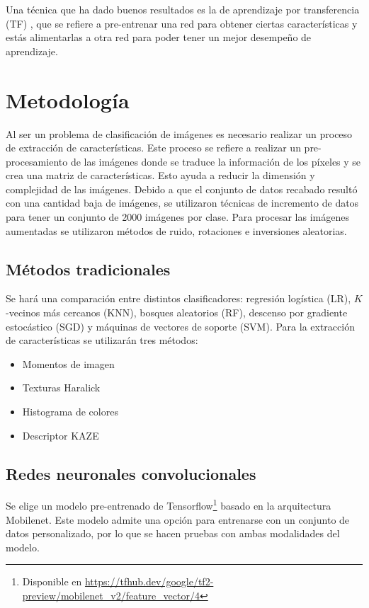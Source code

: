 \documentclass[transmag]{IEEEtran}
\begin{document}
Una técnica que ha dado buenos resultados es la de aprendizaje por transferencia (TF) \cite{yosinski2014transferable}, que se refiere a pre-entrenar una red para obtener ciertas características y estás alimentarlas a otra red para poder tener un mejor desempeño de aprendizaje. 
\section{Metodología}

Al ser un problema de clasificación de imágenes es necesario realizar un proceso de extracción de características. Este proceso se refiere a realizar un pre-procesamiento de las imágenes donde se traduce la información de los píxeles y se crea una matriz de características. Esto ayuda a reducir la dimensión y complejidad de las imágenes. Debido a que el conjunto de datos recabado resultó con una cantidad baja de imágenes, se utilizaron técnicas de incremento de datos para tener un conjunto de 2000 imágenes por clase. Para procesar las imágenes aumentadas se utilizaron métodos de ruido, rotaciones e inversiones aleatorias.

\subsection{Métodos tradicionales}

Se hará una comparación entre distintos clasificadores: regresión logística (LR), $ K $-vecinos más cercanos (KNN), bosques aleatorios (RF), descenso por gradiente estocástico (SGD) y máquinas de vectores de soporte (SVM). Para la extracción de características se utilizarán tres métodos:

\begin{itemize}
	\item Momentos de imagen
	\item Texturas Haralick
	\item Histograma de colores
	\item Descriptor KAZE
\end{itemize}

\subsection{Redes neuronales convolucionales}

Se elige un modelo pre-entrenado de Tensorflow\footnote{Disponible en \url{https://tfhub.dev/google/tf2-preview/mobilenet_v2/feature_vector/4}} basado en la arquitectura Mobilenet. Este modelo admite una opción para entrenarse con un conjunto de datos personalizado, por lo que se hacen pruebas con ambas modalidades del modelo.
\end{document}
